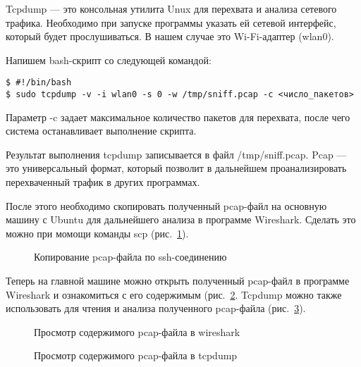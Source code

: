 Tcpdump --- это консольная утилита Unux для перехвата и анализа сетевого трафика. Необходимо при запуске программы указать ей сетевой интерфейс, который будет прослушиваться. В нашем случае это Wi-Fi-адаптер (wlan0).

Напишем bash-скрипт со следующей командой:

\begin{verbatim}
$ #!/bin/bash
$ sudo tcpdump -v -i wlan0 -s 0 -w /tmp/sniff.pcap -c <число_пакетов>
\end{verbatim}

Параметр -c задает максимальное количество пакетов для перехвата, после чего система останавливает выполнение скрипта.

Результат выполнения tcpdump записывается в файл /tmp/sniff.pcap. Pcap --- это универсальный формат, который позволит в дальнейшем проанализировать перехваченный трафик в других программах.

После этого необходимо скопировать полученный pcap-файл на основную машину с Ubuntu для дальнейшего анализа в программе Wireshark. Сделать это можно при момощи команды scp (рис.~\ref{tcpdump_1:tcpdump_1}).

\begin{figure}[h!]
\caption{ Копирование pcap-файла по ssh-соединению }
\label{tcpdump_1:tcpdump_1}
\end{figure}

Теперь на главной машине можно открыть полученный pcap-файл в программе Wireshark и ознакомиться с его содержимым (рис.~\ref{wireshark_1:wireshark_1}. Tcpdump можно также использовать для чтения и анализа полученного pcap-файла (рис.~\ref{tcpdump_2:tcpdump_2}).

\begin{figure}[h!]
\caption{ Просмотр содержимого pcap-файла в wireshark }
\label{wireshark_1:wireshark_1}
\end{figure}

\begin{figure}[h!]
\caption{ Просмотр содержимого pcap-файла в tcpdump }
\label{tcpdump_2:tcpdump_2}
\end{figure}


\clearpage



